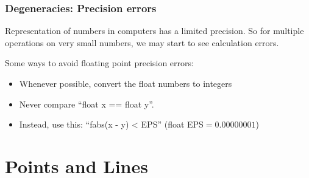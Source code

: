 \documentclass{beamer}
\begin{document}
\begin{frame}
  \frametitle{Degeneracies: Precision errors}

  Representation of  numbers in computers
  has a limited precision. So for multiple operations on very small
  numbers, we may start to see calculation errors.

  \medskip

  Some ways to avoid floating point precision errors:

  \begin{itemize}
  \item Whenever possible, convert the float numbers to integers
  \item Never compare ``float x == float y''. 
  \item Instead, use this: ``fabs(x - y) < EPS'' (float EPS$ = 0.00000001$)
  \end{itemize}

\end{frame}



\section{Points and Lines}
\end{document}
